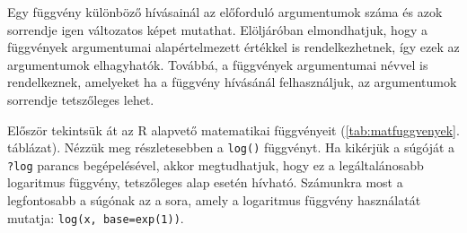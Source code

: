 \documentclass[
]{book}
\begin{document}
Egy függvény különböző hívásainál az előforduló argumentumok száma és azok sorrendje igen változatos képet mutathat. Elöljáróban elmondhatjuk, hogy a függvények argumentumai alapértelmezett értékkel is rendelkezhetnek, így ezek az argumentumok elhagyhatók. Továbbá, a függvények argumentumai névvel is rendelkeznek, amelyeket ha a függvény hívásánál felhasználjuk, az argumentumok sorrendje tetszőleges lehet.

Először tekintsük át az R alapvető matematikai függvényeit (\ref{tab:matfuggvenyek}. táblázat). Nézzük meg részletesebben a \texttt{log()} függvényt. Ha kikérjük a súgóját a \texttt{?log} parancs begépelésével, akkor megtudhatjuk, hogy ez a legáltalánosabb logaritmus függvény, tetszőleges alap esetén hívható. Számunkra most a legfontosabb a súgónak az a sora, amely a logaritmus függvény használatát mutatja: \texttt{log(x,\ base=exp(1))}.

\begin{table}

\caption{\label{tab:matfuggvenyek}Az R alapvető matematikai függvényei}
\centering
{}
\end{table}
\end{document}
